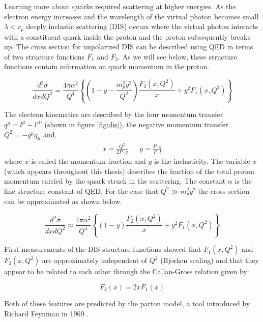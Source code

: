 Learning more about quarks required scattering at higher energies.  As the electron energy increases and the wavelength of the virtual photon becomes small $\lambda < r_p$ deeply inelastic scattering (DIS) occurs where the virtual photon interacts with a constituent quark inside the proton and the proton subsequently breaks up.  The cross section for unpolarized DIS can be described using QED in terms of two structure functions $F_1$ and $F_2$.  As we will see below, these structure functions contain information on quark momentum in the proton.

\begin{equation}
	\label{eqn:sfs}
	\frac{d^2\sigma}{dx dQ^2} = \frac{4 \pi \alpha^2}{Q^4} \left\lbrace \left( 1 - y - \frac{m_p^2 y^2}{Q^2} \right) \frac{F_2(x,Q^2)}{x} + y^2 F_1 (x,Q^2) \right\rbrace
\end{equation}

The electron kinematics are described by the four momentum transfer $q^{\mu} = l^{\mu} - l'^{\mu}$ (shown in figure \ref{fig:dis}), the negative momentum transfer $Q^2 = - q^{\mu} q_{\mu}$ and,
\begin{align}
  \label{eqn:electron-kinematics}
  x = \frac{Q^{2}}{2P \cdot q} && y = \frac{P \cdot q}{P \cdot l} 
\end{align}
where $x$ is called the momentum fraction and $y$ is the inelasticity.  The variable $x$ (which appears throughout this thesis) describes the fraction of the total proton momentum carried by the quark struck in the scattering.  The constant $\alpha$ is the fine structure constant of QED.  For the case that $Q^2 \gg m_p^2 y^2$ the cross section can be approximated as shown below.

\begin{equation}
	\label{eqn:sfs2}
	\frac{d^2\sigma}{dx dQ^2} \approx \frac{4 \pi \alpha^2}{Q^4} \left\lbrace \left( 1 - y \right) \frac{F_2(x,Q^2)}{x} + y^2 F_1 (x,Q^2) \right\rbrace
\end{equation}

First measurements of the DIS structure functions \cite{history-bjorken:1969} showed that $F_1(x,Q^2)$ and $F_2(x,Q^2)$ are approximately independent of $Q^2$ (Bjorken scaling) and that they appear to be related to each other through the Callan-Gross relation given by:

\begin{equation}	
	F_{2} (x) = 2xF_1 (x)
	\label{eqn:callan-gross}
\end{equation}

Both of these features are predicted by the parton model, a tool introduced by Richard Feynman in 1969 \cite{history-feynman:1969}.

